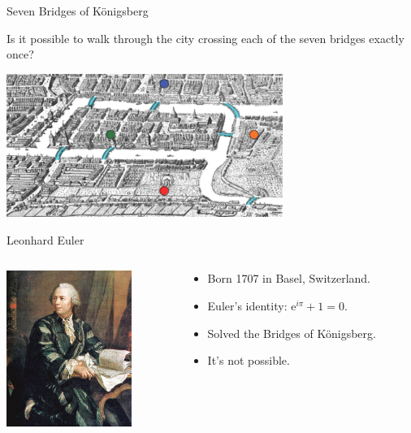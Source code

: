 \begin{frame}{Seven Bridges of K{\"o}nigsberg}
  \begin{alertblock}{Is it possible to walk through the city crossing each of the seven bridges exactly once?}
  \begin{center}
    \includegraphics[width=9cm]{img/konigsberg.png}
  \end{center}
\end{alertblock}
\end{frame}

\begin{frame}{Leonhard Euler}  
  \begin{columns}[T]
    \begin{column}{0.3\textwidth}
      \includegraphics[height=2in]{img/euler.jpg}
    \end{column}
    \begin{column}{0.65\textwidth}
      \begin{itemize}
        \setlength\itemsep{3mm}
        \item Born 1707 in Basel, Switzerland.
        \item Euler's identity: $\mathrm{e}^{i \pi} + 1 = 0$.
        \item Solved the Bridges of K{\"o}nigsberg.
        \item It's not possible.
      \end{itemize}
    \end{column}
  
  \end{columns}
\end{frame}

